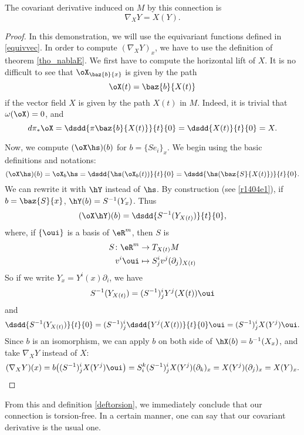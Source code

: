 \begin{proposition}
The covariant derivative induced on $M$ by this connection is
\begin{equation}\label{derrcovexplicite}
                 \nabla_XY=X(Y).
\end{equation}
\end{proposition}

\begin{proof}
In this demonstration, we will use the equivariant functions defined in \ref{equivvec}. In order to compute $(\nabla_XY)_x$, we have to use the definition of theorem \ref{tho_nablaE}. We first have to compute the horizontal lift of $X$. It is no difficult to see that $\oX_{\baz{b}{x}}$ is given by the path
\[\oX(t)=\baz{b}{X(t)}\]
if the vector field $X$ is given by the path $X(t)$ in $M$. Indeed, it is trivial that $\omega(\oX)=0$, and
\[d\pi_*\oX=\dsdd{\pi\baz{b}{X(t)}}{t}{0}=\dsdd{X(t)}{t}{0}=X.\]

Now, we compute $(\oX\hs)(b)$ for $b=\{Se_i\}_x$. We begin using the basic definitions and notations:
\[
(\oX\hs)(b)=\oX_b\hs=\dsdd{\hs(\oX_b(t))}{t}{0}=\dsdd{\hs(\baz{S}{X(t)})}{t}{0}.
\]
We can rewrite it with $\hY$ instead of $\hs$. By construction (see \eqref{r1404e1}), if $b=\baz{S}{x}$, $\hY(b)=S^{-1}(Y_x)$. Thus
\[
(\oX\hY)(b)=\dsdd{S^{-1}(Y_{X(t)})}{t}{0},
\]
where, if $\{\oui\}$ is a basis of $\eR^m$, then $S$ is 
\begin{equation}
\begin{aligned}
 S\colon\eR^m&\to T_{X(t)}M \\ 
 v^i\oui &\mapsto S^i_jv^j(\partial_j)_{X(t)} 
\end{aligned}
\end{equation}
So if we write $Y_x=Y^i(x)\partial_i$, we have
\[
S^{-1}(Y_{X(t)})=(S^{-1})^i_jY^j(X(t))\oui
\]
and
\[
\dsdd{S^{-1}(Y_{X(t)})}{t}{0}=(S^{-1})^i_j\dsdd{Y^j(X(t))}{t}{0}\oui=(S^{-1})^i_jX(Y^j)\oui.
\]
Since $b$ is an isomorphism, we can apply $b$ on both side of $\hX(b)=b^{-1}(X_x)$, and take $\nabla_XY$ instead of $X$:
\begin{equation}
 (\nabla_XY)(x)=b\big((S^{-1})^i_jX(Y^j)\oui\big)
               =S^k_i(S^{-1})^i_jX(Y^j)(\partial_k)_x
               =X(Y^j)(\partial_j)_x
               =X(Y)_x.
\end{equation}
\end{proof}

From this and definition \ref{deftorsion}, we immediately conclude that our connection is torsion-free. In a certain manner, one can say that our covariant derivative is the usual one.

